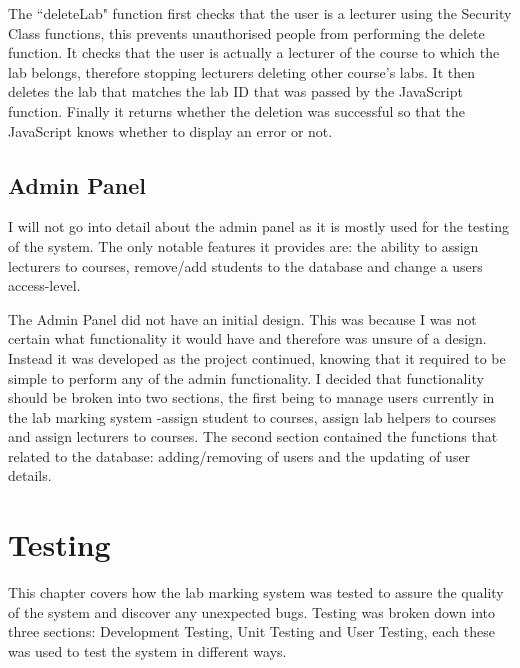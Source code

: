 \documentclass[11pt]{report}
\begin{document}
The ``deleteLab" function first checks that the user is a lecturer using the Security Class functions, this prevents unauthorised people from performing the delete function. It checks that the user is actually a lecturer of the course to which the lab belongs, therefore  stopping lecturers deleting other course's labs. It then deletes the lab that matches the lab ID that was passed by the JavaScript function. Finally it returns whether the deletion was successful so that the JavaScript knows whether to display an error or not.


\section{Admin Panel}

I will not go into detail about the admin panel as it is mostly used for the testing of the system. The only notable features it provides are: the ability to assign lecturers to courses, remove/add students to the database and change a users access-level. 

The Admin Panel did not have an initial design. This was because I was not certain what functionality it would have and therefore was unsure of a design. Instead it was developed as the project continued, knowing that it required to be simple to perform any of the admin functionality. I decided that functionality should be broken into two sections, the first being to manage users currently in the lab marking system -assign student to courses, assign lab helpers to courses and assign lecturers to courses. The second section contained the functions that related to the database: adding/removing of users and the updating of user details.  









\newpage
\chapter{Testing}

This chapter covers how the lab marking system was tested to assure the quality of the system and discover any unexpected bugs. Testing was broken down into three sections: Development Testing, Unit Testing and User Testing, each these was used to test the system in different ways.
\end{document}

